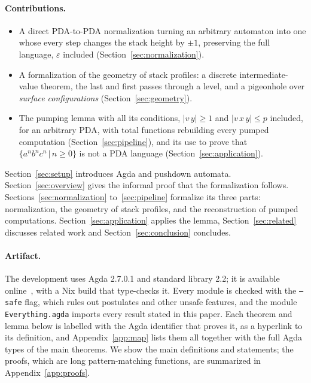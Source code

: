 \documentclass[runningheads]{llncs}
\begin{document}
\paragraph{Contributions.}
\begin{itemize}
\item A direct PDA-to-PDA normalization turning an arbitrary automaton into one
  whose every step changes the stack height by $\pm 1$, preserving the full
  language, $\varepsilon$ included (Section~\ref{sec:normalization}).
\item A formalization of the geometry of stack profiles: a discrete
  intermediate-value theorem, the last and first passes through a level, and a
  pigeonhole over \emph{surface configurations} (Section~\ref{sec:geometry}).
\item The pumping lemma with all its conditions, $|v\,y| \geq 1$ and
  $|v\,x\,y| \leq p$ included, for an arbitrary PDA, with total functions
  rebuilding every pumped computation (Section~\ref{sec:pipeline}), and its use
  to prove that $\{a^{n}b^{n}c^{n}\,|\,n\geq 0\}$ is not a PDA language
  (Section~\ref{sec:application}).
\end{itemize}

Section~\ref{sec:setup} introduces Agda and pushdown automata.
Section~\ref{sec:overview} gives the informal proof that the formalization
follows. Sections~\ref{sec:normalization} to~\ref{sec:pipeline} formalize its
three parts: normalization, the geometry of stack profiles, and the
reconstruction of pumped computations. Section~\ref{sec:application} applies the
lemma, Section~\ref{sec:related} discusses related work and
Section~\ref{sec:conclusion} concludes.

\paragraph{Artifact.}
The development uses Agda 2.7.0.1 and standard library 2.2; it is
available online~\cite{repo}, with a Nix build that type-checks it. Every module
is checked with the \texttt{--safe} flag, which rules out postulates and other
unsafe features, and the module \texttt{Everything.agda} imports every result
stated in this paper. Each theorem and lemma below is labelled with the Agda
identifier that proves it, as a hyperlink to its definition, and
Appendix~\ref{app:map} lists them all together with the full Agda types of the
main theorems. We show the main definitions and statements; the proofs,
which are long pattern-matching functions, are summarized in
Appendix~\ref{app:proofs}.
\end{document}
